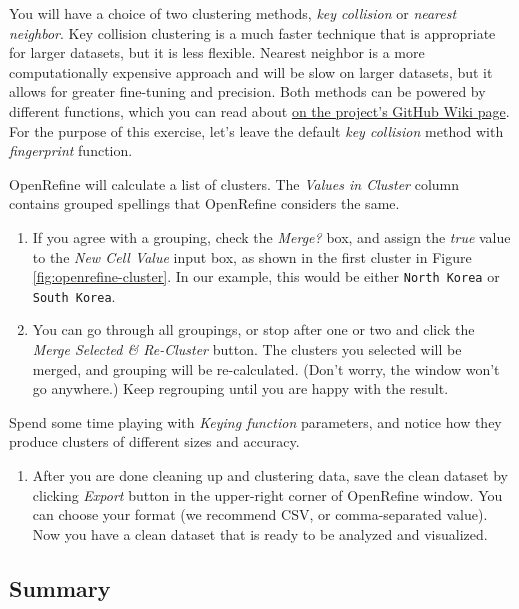 \documentclass[
  english,
]{book}
\providecommand{\tightlist}{%
  \setlength{\itemsep}{0pt}\setlength{\parskip}{0pt}}
\begin{document}
You will have a choice of two clustering methods, \emph{key collision} or \emph{nearest neighbor}. Key collision
clustering is a much faster technique that is appropriate for larger datasets, but it is less flexible.
Nearest neighbor is a more computationally expensive approach and will be slow on larger datasets,
but it allows for greater fine-tuning and precision. Both methods can be powered by different functions,
which you can read about \href{https://github.com/OpenRefine/OpenRefine/wiki/Clustering-In-Depth}{on the project's GitHub Wiki page}. For the purpose of this exercise, let's leave the default \emph{key collision} method with \emph{fingerprint} function.

OpenRefine will calculate a list of clusters. The \emph{Values in Cluster} column contains grouped spellings
that OpenRefine considers the same.

\begin{enumerate}
\def\labelenumi{\arabic{enumi}.}
\setcounter{enumi}{1}
\item
  If you agree with a grouping, check the \emph{Merge?} box, and assign the \emph{true} value to the \emph{New Cell Value} input box, as shown in the first cluster in Figure \ref{fig:openrefine-cluster}. In our example, this would be either \texttt{North\ Korea} or \texttt{South\ Korea}.
\item
  You can go through all groupings, or stop after one or two and click the \emph{Merge Selected \& Re-Cluster} button. The clusters you selected will be merged, and grouping will be re-calculated.
  (Don't worry, the window won't go anywhere.) Keep regrouping until you are happy with the result.
\end{enumerate}

Spend some time playing with \emph{Keying function} parameters, and notice
how they produce clusters of different sizes and accuracy.

\begin{enumerate}
\def\labelenumi{\arabic{enumi}.}
\setcounter{enumi}{3}
\tightlist
\item
  After you are done cleaning up and clustering data, save the clean dataset
  by clicking \emph{Export} button in the upper-right corner of OpenRefine window.
  You can choose your format (we recommend CSV, or comma-separated value).
  Now you have a clean dataset that is ready to be analyzed and visualized.
\end{enumerate}

\hypertarget{summary4}{%
\subsection*{Summary}\label{summary4}}
\end{document}
